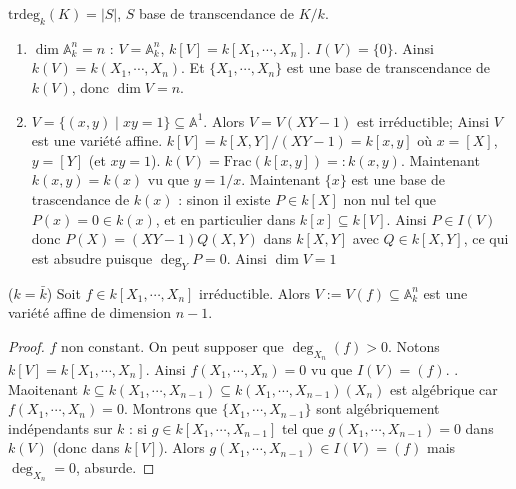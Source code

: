             \begin{defi}
                $\mathrm{trdeg}_k(K) = |S|$, $S$ base de transcendance de $K/k$.
            \end{defi}
            \begin{expl}
                \begin{enumerate}
                    \item $\dim \mathbb{A}_k^n = n$ : $V = \mathbb{A}_k^n$, $k[V] = k[X_1, \cdots, X_n]$. $I(V) = \{0\}$. Ainsi $k(V) = k(X_1, \cdots, X_n)$. Et $\{X_1, \cdots, X_n\}$ est une base de transcendance de $k(V)$, donc $\dim V = n$.
                    \item $V = \{(x,y) \mid xy = 1\} \subseteq \mathbb{A}^1$. Alors $V = V(XY - 1)$ est irréductible; Ainsi $V$ est une variété affine. $k[V] = k[X,Y]/(XY - 1) = k[x,y]$ où $x = [X]$, $y = [Y]$ (et $xy = 1$). $k(V) = \mathrm{Frac} (k[x,y]) =: k(x,y)$. Maintenant $k(x,y) = k(x)$ vu que $y = 1/x$. Maintenant $\{x\}$ est une base de trascendance de $k(x)$ : sinon il existe $P \in k[X]$ non nul tel que $P(x) = 0 \in k(x)$, et en particulier dans $k[x] \subseteq k[V]$. Ainsi $P \in I(V)$ donc $P(X) = (XY - 1)Q(X,Y)$ dans $k[X,Y]$ avec $Q \in k[X,Y]$, ce qui est absudre puisque $\deg_YP = 0$. Ainsi $\dim V = 1$
                \end{enumerate} 
            \end{expl}
            \begin{lemm}
                ($k = \bar k$) Soit $f \in k[X_1, \cdots, X_n]$ irréductible. Alors $V := V(f) \subseteq \mathbb{A}_k^n$ est une variété affine de dimension $n-1$.
            \end{lemm}
            \begin{proof}
                $f$ non constant. On peut supposer que $\deg_{X_n}(f) > 0$. Notons $k[V] = k[X_1, \cdots, X_n]$. Ainsi $f(X_1, \cdots, X_n) = 0$ vu que $I(V) = (f)$. . Maoitenant $k \subseteq k(X_1, \cdots, X_{n-1}) \subseteq k(X_1, \cdots, X_{n-1})(X_n)$ est algébrique car $f(X_1, \cdots, X_n) = 0$. Montrons que $\{X_1, \cdots, X_{n-1}\}$ sont algébriquement indépendants sur $k$ : si $g \in k[X_1, \cdots, X_{n-1}]$ tel que $g(X_1, \cdots, X_{n-1}) = 0$ dans $k(V)$ (donc dans $k[V]$). Alors $g(X_1, \cdots, X_{n-1}) \in I(V) = (f)$ mais $\deg_{X_n} = 0$, absurde.
            \end{proof}